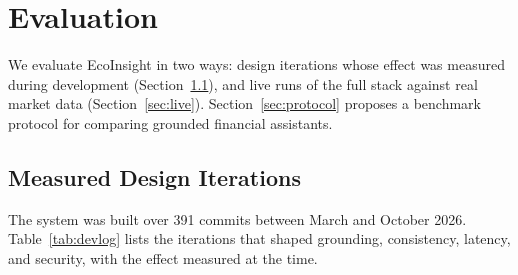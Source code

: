 \documentclass[conference]{IEEEtran}
\begin{document}
\section{Evaluation}
\label{sec:eval}

We evaluate EcoInsight in two ways: design iterations whose effect was measured during development (Section~\ref{sec:devlog}), and live runs of the full stack against real market data (Section~\ref{sec:live}). Section~\ref{sec:protocol} proposes a benchmark protocol for comparing grounded financial assistants.

\subsection{Measured Design Iterations}
\label{sec:devlog}

The system was built over 391 commits between March and October 2026. Table~\ref{tab:devlog} lists the iterations that shaped grounding, consistency, latency, and security, with the effect measured at the time.
\end{document}
